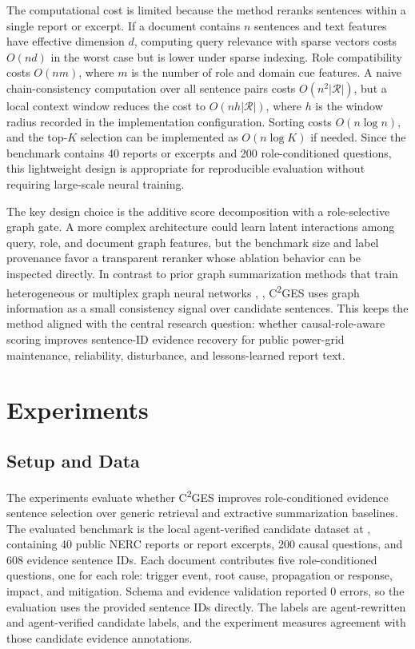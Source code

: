\documentclass{ieeeaccess}
\begin{document}
The computational cost is limited because the method reranks sentences within a single report or excerpt. If a document contains \(n\) sentences and text features have effective dimension \(d\), computing query relevance with sparse vectors costs \(O(nd)\) in the worst case but is lower under sparse indexing. Role compatibility costs \(O(nm)\), where \(m\) is the number of role and domain cue features. A naive chain-consistency computation over all sentence pairs costs \(O(n^2|\mathcal{R}|)\), but a local context window reduces the cost to \(O(nh|\mathcal{R}|)\), where \(h\) is the window radius recorded in the implementation configuration. Sorting costs \(O(n\log n)\), and the top-\(K\) selection can be implemented as \(O(n\log K)\) if needed. Since the benchmark contains 40 reports or excerpts and 200 role-conditioned questions, this lightweight design is appropriate for reproducible evaluation without requiring large-scale neural training.

The key design choice is the additive score decomposition with a role-selective graph gate. A more complex architecture could learn latent interactions among query, role, and document graph features, but the benchmark size and label provenance favor a transparent reranker whose ablation behavior can be inspected directly. In contrast to prior graph summarization methods that train heterogeneous or multiplex graph neural networks \cite{wang2020heterogeneous}, \cite{jing2021multiplex}, C\textsuperscript{2}GES uses graph information as a small consistency signal over candidate sentences. This keeps the method aligned with the central research question: whether causal-role-aware scoring improves sentence-ID evidence recovery for public power-grid maintenance, reliability, disturbance, and lessons-learned report text.

\section{Experiments}

\label{sec:experiments}

\subsection{Setup and Data}

\label{sec:setup_and_data}

The experiments evaluate whether C\textsuperscript{2}GES improves role-conditioned evidence sentence selection over generic retrieval and extractive summarization baselines. The evaluated benchmark is the local agent-verified candidate dataset at , containing 40 public NERC reports or report excerpts, 200 causal questions, and 608 evidence sentence IDs. Each document contributes five role-conditioned questions, one for each role: trigger event, root cause, propagation or response, impact, and mitigation. Schema and evidence validation reported 0 errors, so the evaluation uses the provided sentence IDs directly. The labels are agent-rewritten and agent-verified candidate labels, and the experiment measures agreement with those candidate evidence annotations.
\end{document}
